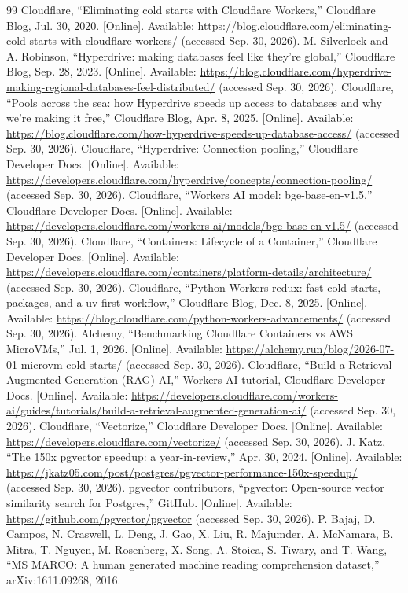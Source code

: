 \documentclass[conference]{IEEEtran}
\begin{document}
\begin{thebibliography}{99}
 Cloudflare, ``Eliminating cold starts with Cloudflare Workers,'' Cloudflare
Blog, Jul. 30, 2020. [Online]. Available:
\url{https://blog.cloudflare.com/eliminating-cold-starts-with-cloudflare-workers/} (accessed
Sep. 30, 2026).
 M. Silverlock and A. Robinson, ``Hyperdrive: making databases feel like
they're global,'' Cloudflare Blog, Sep. 28, 2023. [Online]. Available:
\url{https://blog.cloudflare.com/hyperdrive-making-regional-databases-feel-distributed/} (accessed
Sep. 30, 2026).
 Cloudflare, ``Pools across the sea: how Hyperdrive speeds up access to
databases and why we're making it free,'' Cloudflare Blog, Apr. 8, 2025. [Online]. Available:
\url{https://blog.cloudflare.com/how-hyperdrive-speeds-up-database-access/} (accessed Sep. 30,
2026).
 Cloudflare, ``Hyperdrive: Connection pooling,'' Cloudflare Developer
Docs. [Online]. Available:
\url{https://developers.cloudflare.com/hyperdrive/concepts/connection-pooling/} (accessed Sep. 30,
2026).
 Cloudflare, ``Workers AI model: bge-base-en-v1.5,'' Cloudflare Developer Docs.
[Online]. Available: \url{https://developers.cloudflare.com/workers-ai/models/bge-base-en-v1.5/}
(accessed Sep. 30, 2026).
 Cloudflare, ``Containers: Lifecycle of a Container,'' Cloudflare Developer
Docs. [Online]. Available:
\url{https://developers.cloudflare.com/containers/platform-details/architecture/} (accessed
Sep. 30, 2026).
 Cloudflare, ``Python Workers redux: fast cold starts, packages, and a uv-first
workflow,'' Cloudflare Blog, Dec. 8, 2025. [Online]. Available:
\url{https://blog.cloudflare.com/python-workers-advancements/} (accessed Sep. 30, 2026).
 Alchemy, ``Benchmarking Cloudflare Containers vs AWS MicroVMs,'' Jul. 1,
2026. [Online]. Available: \url{https://alchemy.run/blog/2026-07-01-microvm-cold-starts/}
(accessed Sep. 30, 2026).
 Cloudflare, ``Build a Retrieval Augmented Generation (RAG) AI,'' Workers
AI tutorial, Cloudflare Developer Docs. [Online]. Available:
\url{https://developers.cloudflare.com/workers-ai/guides/tutorials/build-a-retrieval-augmented-generation-ai/}
(accessed Sep. 30, 2026).
 Cloudflare, ``Vectorize,'' Cloudflare Developer Docs. [Online]. Available:
\url{https://developers.cloudflare.com/vectorize/} (accessed Sep. 30, 2026).
 J. Katz, ``The 150x pgvector speedup: a year-in-review,'' Apr. 30, 2024.
[Online]. Available: \url{https://jkatz05.com/post/postgres/pgvector-performance-150x-speedup/}
(accessed Sep. 30, 2026).
 pgvector contributors, ``pgvector: Open-source vector similarity search for
Postgres,'' GitHub. [Online]. Available: \url{https://github.com/pgvector/pgvector} (accessed
Sep. 30, 2026).
 P. Bajaj, D. Campos, N. Craswell, L. Deng, J. Gao, X. Liu, R. Majumder,
A. McNamara, B. Mitra, T. Nguyen, M. Rosenberg, X. Song, A. Stoica, S. Tiwary, and T. Wang, ``MS
MARCO: A human generated machine reading comprehension dataset,'' arXiv:1611.09268, 2016.
\end{thebibliography}
\end{document}
